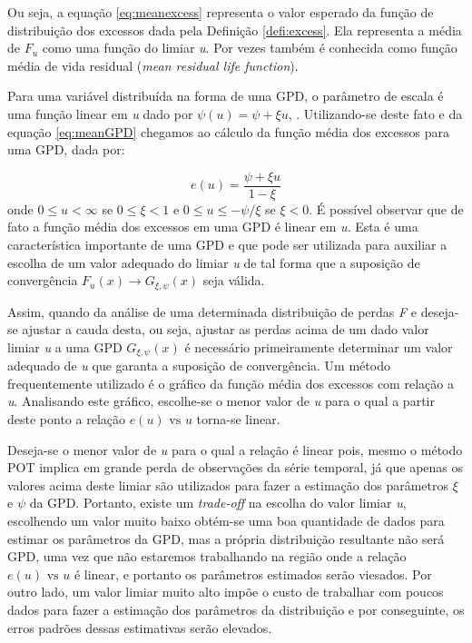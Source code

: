 \documentclass[review]{elsarticle}
\theoremstyle{definition}
\begin{document}
Ou seja, a equação \eqref{eq:meanexcess} representa o valor esperado da função de distribuição dos excessos dada pela Definição \ref{defi:excess}. Ela representa a média de $F_u$ como uma função do limiar \emph{u}. Por vezes também é conhecida como função média de vida residual (\emph{mean residual life function}).

Para uma variável distribuída na forma de uma GPD, o parâmetro de escala é uma função linear em \emph{u} dado por $\psi(u)=\psi + \xi u$, \cite[Teorema 3.4.13(e)]{Embrechts1997}. Utilizando-se deste fato e da equação \eqref{eq:meanGPD} chegamos ao cálculo da função média dos excessos para uma GPD, dada por:

\begin{equation}
\label{eq:eu}
e(u)=\frac{\psi+\xi u}{1-\xi}
\end{equation}
onde $0 \leq u < \infty$ se $0 \leq \xi <1$ e $0 \leq u \leq -\psi / \xi$ se $\xi < 0$. É possível observar que de fato a função média dos excessos em uma GPD é linear em \emph{u}. Esta é uma característica importante de uma GPD e que pode ser utilizada para auxiliar a escolha de um valor adequado do limiar \emph{u} de tal forma que a suposição de convergência $F_u(x) \rightarrow G_{\xi, \psi}(x)$ seja válida.

Assim, quando da análise de uma determinada distribuição de perdas \emph{F} e deseja-se ajustar a cauda desta, ou seja, ajustar as perdas acima de um dado valor limiar \emph{u} a uma GPD $G_{\xi, \psi}(x)$ é necessário primeiramente determinar um valor adequado de \emph{u} que garanta a suposição de convergência. Um método frequentemente utilizado é o gráfico da função média dos excessos com relação a \emph{u}. Analisando este gráfico, escolhe-se o menor valor de \emph{u} para o qual a partir deste ponto a relação $e(u) \text{ vs } u$ torna-se linear.

Deseja-se o menor valor de \emph{u} para o qual a relação é linear pois, mesmo o método POT implica em grande perda de observações da série temporal, já que apenas os valores acima deste limiar são utilizados para fazer a estimação dos parâmetros $\xi$ e $\psi$ da GPD. Portanto, existe um \emph{trade-off} na escolha do valor limiar \emph{u}, escolhendo um valor muito baixo obtém-se uma boa quantidade de dados para estimar os parâmetros da GPD, mas a própria distribuição resultante não será GPD, uma vez que não estaremos trabalhando na região onde a relação $e(u) \text{ vs } u$ é linear, e portanto os parâmetros estimados serão viesados. Por outro lado, um valor limiar muito alto impõe o custo de trabalhar com poucos dados para fazer a estimação dos parâmetros da distribuição e por conseguinte, os erros padrões dessas estimativas serão elevados.
\end{document}
